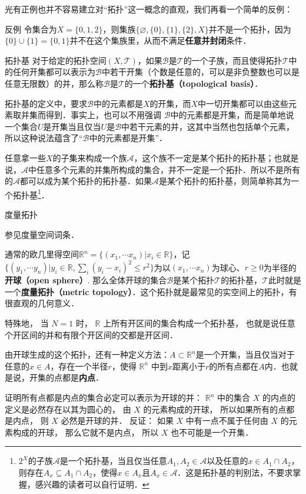 光有正例也并不容易建立对“拓扑”这一概念的直观，我们再看一个简单的反例：

\begin{example}{反例}
令集合为$X=\{0, 1, 2\}$，则集族$\{\varnothing, \{0\},\{1\},\{2\}, X\}$并不是一个拓扑，因为$\{0\}\cup\{1\}=\{0,1\}$并不在这个集族里，从而不满足\textbf{任意并封闭}条件．
\end{example}

\begin{definition}{拓扑基}\label{Topol_def2}
对于给定的拓扑空间$(X, \mathcal{T})$，如果$\mathcal{B}$是$\mathcal{T}$的一个子族，而且使得拓扑$\mathcal{T}$中的任何开集都可以表示为$\mathcal{B}$中若干开集（个数是任意的，可以是非负整数也可以是任意无限数）的并，那么称$\mathcal{B}$是$\mathcal{T}$的一个\textbf{拓扑基（topological basis）}．
\end{definition}

拓扑基的定义中，要求$\mathcal{B}$中的元素都是$X$的开集，而$X$中一切开集都可以由这些元素取并集而得到．事实上，也可以不用强调
$\mathcal{B}$中的元素都是开集，而是简单地说一个集合$U$是开集当且仅当$U$是$\mathcal{B}$中若干元素的并，这其中当然也包括单个元素，所以这种说法蕴含了“$\mathcal{B}$中的元素都是开集”．

任意拿一些$X$的子集来构成一个族$\mathcal{A}$，这个族不一定是某个拓扑的拓扑基；也就是说，$\mathcal{A}$中任意多个元素的并集所构成的集合，并不一定是一个拓扑．所以不是所有的$\mathcal{A}$都可以成为某个拓扑的拓扑基．如果$\mathcal{A}$是某个拓扑的拓扑基，则简单称其为一个拓扑基\footnote{$2^X$的子族$\mathcal{A}$是一个拓扑基，当且仅当任意$A_1, A_2\in\mathcal{A}$以及任意的$x\in A_1\cap A_2$，则存在$A_x\subseteq A_1\cap A_2$，使得$x\in A_x$且$A_x\in \mathcal{A}$．这是拓扑基的判别法，不要求掌握，感兴趣的读者可以自行证明．}．


\begin{example}{度量拓扑}

参见度量空间词条．

通常的欧几里得空间$\mathbb{R}^n=\{(x_1, \cdots x_n)|x_i\in \mathbb{R}\}$，记$\{(y_1, \cdots y_n)|y_i\in \mathbb{R}, \sum_i(y_i-x_i)^2\leq r^2\}$为以$(x_1, \cdots x_n)$为球心、$r\geqslant 0$为半径的\textbf{开球（open sphere）}. 那么全体开球的集合$\mathcal{B}$是某个拓扑$\mathcal{T}$的拓扑基，$\mathcal{T}$此时就是一个\textbf{度量拓扑（metric topology）}．这个拓扑就是最常见的实空间上的拓扑，有很直观的几何意义．

特殊地， 当 $N = 1$ 时， $\mathbb R$ 上所有开区间的集合构成一个拓扑基， 也就是说任意个开区间的并和有限个开区间的交都是开区间．

由开球生成的这个拓扑，还有一种定义方法：$A\subset \mathbb{R}^n$是一个开集，当且仅当对于任意的$x\in A$，存在一个半径$r$，使得 $\mathbb R^n$ 中到$x$距离小于$r$的所有点都在$A$内．也就是说，开集的点都是\textbf{内点}．

证明所有点都是内点的集合必定可以表示为开球的并： $\mathbb R^n$ 中的集合 $X$ 的内点的定义是必然存在以其为圆心的， 由 $X$ 的元素构成的开球， 所以如果所有的点都是内点， 则 $X$ 必然是开球的并． 反证： 如果 $X$ 中有一点不属于任何由 $X$ 的元素构成的开球， 那么它就不是内点， 所以 $X$ 也不可能是一个开集．
\end{example}

